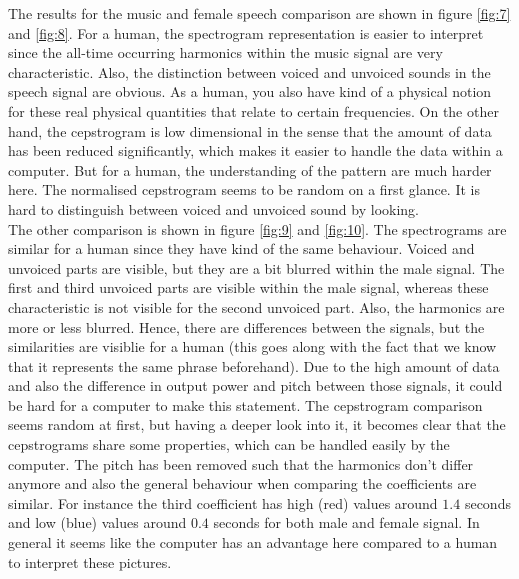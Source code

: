The results for the music and female speech comparison are shown in figure \ref{fig:7} and \ref{fig:8}. For a human, the spectrogram representation is easier to interpret since the all-time occurring harmonics within the music signal are very characteristic. Also, the distinction between voiced and unvoiced sounds in the speech signal are obvious. As a human, you also have kind of a physical notion for these real physical quantities that relate to certain frequencies. On the other hand, the cepstrogram is low dimensional in the sense that the amount of data has been reduced significantly, which makes it easier to handle the data within a computer. But for a human, the understanding of the pattern are much harder here. The normalised cepstrogram seems to be random on a first glance. It is hard to distinguish between voiced and unvoiced sound by looking.\\

The other comparison is shown in figure \ref{fig:9} and \ref{fig:10}. The spectrograms are similar for a human since they have kind of the same behaviour. Voiced and unvoiced parts are visible, but they are a bit blurred within the male signal. The first and third unvoiced parts are visible within the male signal, whereas these characteristic is not visible for the second unvoiced part. Also, the harmonics are more or less blurred. Hence, there are differences between the signals, but the similarities are visiblie for a human (this goes along with the fact that we know that it represents the same phrase beforehand). Due to the high amount of data and also the difference in output power and pitch between those signals, it could be hard for a computer to make this statement. The cepstrogram comparison seems random at first, but having a deeper look into it, it becomes clear that the cepstrograms share some properties, which can be handled easily by the computer. The pitch has been removed such that the harmonics don't differ anymore and also the general behaviour when comparing the coefficients are similar. For instance the third coefficient has high (red) values around $1.4$ seconds and low (blue) values around $0.4$ seconds for both male and female signal. In general it seems like the computer has an advantage here compared to a human to interpret these pictures.

